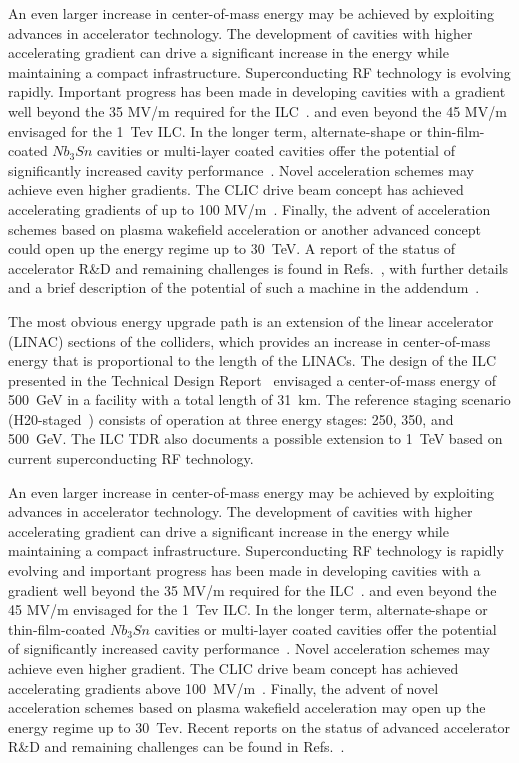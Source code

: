 An even larger increase in center-of-mass energy may be achieved by
exploiting advances in accelerator technology. The development of
cavities with higher accelerating gradient can drive a significant
increase in the energy while maintaining a compact infrastructure.
Superconducting RF technology is evolving rapidly. Important
progress has been made in developing cavities with a gradient well
beyond the 35 MV/m required for 
the ILC~\cite{Grassellino:2018tqg,Grassellino:2017bod}.
and even beyond the 45 MV/m envisaged for
 the 1~Tev{} ILC.     In the longer term, alternate-shape
or thin-film-coated $Nb_3Sn$ cavities
 or multi-layer coated cavities offer the potential of
significantly increased cavity performance~\cite{Adolphsen:2013jya}.
Novel acceleration schemes may achieve even higher gradients. 
The CLIC drive beam concept has
achieved accelerating gradients of up to 100 MV/m~\cite{Aicheler:2012bya}.
Finally, the advent of acceleration schemes based on plasma
wakefield 
acceleration or another advanced concept could 
open up the energy regime up to 30~TeV. A report of the status of accelerator R\&D and remaining
challenges is found in Refs.~\cite{advancedLC2020,advancedLC}, with further details and
a brief description of the potential of such a machine in the
addendum~\cite{advancedLCaddendum}.

The most obvious energy upgrade path is an extension of the linear
accelerator (LINAC) sections of the colliders, which provides an increase
in center-of-mass energy that is proportional to the length of the LINACs.
The design of the ILC presented in the Technical Design
Report~\cite{Behnke:2013xla,Adolphsen:2013jya,Adolphsen:2013kya} envisaged a
center-of-mass energy of 500~GeV{} in a facility with a total length of 31~km.
The reference staging scenario (H20-staged~\cite{Barklow:2015tja}) consists of operation at
three energy stages: 250, 350, and 500~GeV. The ILC TDR also documents
a possible extension to 1~TeV based on current superconducting RF technology. 



An even larger increase in center-of-mass energy may be achieved by
exploiting advances in accelerator technology. The development of
cavities with higher accelerating gradient can drive a significant
increase in the energy while maintaining a compact infrastructure.
Superconducting RF technology is rapidly evolving and important
progress has been made in developing cavities with a gradient well
beyond the 35 MV/m required for the ILC~\cite{Grassellino:2018tqg,Grassellino:2017bod}.
and even beyond the 45 MV/m envisaged for the 1~Tev{} ILC. In the longer term, alternate-shape
or thin-film-coated $Nb_3Sn$ cavities or multi-layer coated cavities offer the potential of
significantly increased cavity performance~\cite{Adolphsen:2013jya}.
Novel acceleration schemes may achieve even higher gradient. The CLIC drive beam concept has
achieved accelerating gradients above  100~MV/m~\cite{Robson:2018enq}.
Finally, the advent of novel acceleration schemes based on plasma wakefield acceleration
may open up the energy regime up to 30~Tev. Recent reports on
 the status of advanced  accelerator R\&D and remaining
challenges can be found in Refs.~\cite{Cros:2017jxp,Cros:2019tns}.

